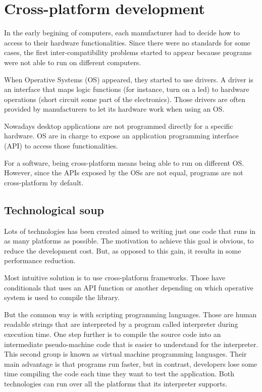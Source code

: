 \chapter{Cross-platform development}
\label{S:cp-develompent}

In the early begining of computers, each manufacturer had to decide how to access to
their hardware functionalities. Since there were no standards for some cases,
the first inter-compatibility problems started to appear because programs were
not able to run on different computers.

When Operative Systems (OS) appeared, they started to use drivers. A driver is
an interface that maps logic functions (for instance, turn on a led) to hardware
operations (short circuit some part of the electronics). Those drivers are
often provided by manufacturers to let its hardware work when using an OS.

Nowadays desktop applications are not programmed directly for a specific 
hardware. OS are in charge to expose an application programming interface (API)
to access those functionalities.

For a software, being cross-platform means being able to run on different OS. However, since the APIs
exposed by the OSs are not equal, programs are not cross-platform by default.

\section{Technological soup}

Lots of technologies has been created aimed to writing just one code that runs
in as many platforms as possible. The motivation to achieve this goal is
obvious, to reduce the development cost. But, as opposed to this gain, it
results in some performance reduction.

Most intuitive solution is to use cross-platform frameworks. Those have
conditionals that uses an API function or another depending on which operative
system is used to compile the library.

But the common way is with scripting programming languages. Those are human
readable strings that are interpreted by a program called interpreter during
execution time. One step further is to compile the source code into an
intermediate pseudo-machine code that is easier to understand for the
interpreter. This second group is known as virtual machine programming
languages. Their main advantage is that programs run faster, but in contrast,
developers lose some time compiling the code each time they want to test the
application. Both technologies can run over all the platforms that its
interpreter supports.

